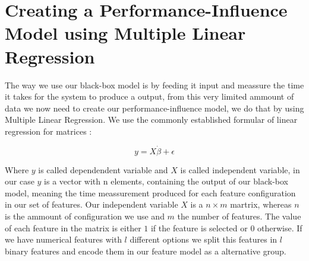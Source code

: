 \section{Creating a Performance-Influence Model using Multiple Linear Regression}
The way we use our black-box model is by feeding it input and meassure the time it takes for the system to produce a output, from this 
very limited ammount of data we now need to create our performance-influence model, we do that by using Multiple Linear Regression.
We use the commonly established formular of linear regression for matrices \cite{Linear-Regression}:

\begin{equation*}
        y = X \dot \beta + \epsilon
\end{equation*}

Where $y$ is called dependendent variable and $X$ is called independent variable, in our case $y$ is a vector with n elements, containing
the output of our black-box model, meaning the time meassurement produced for each feature configuration in our set of features. 
Our independent variable $X$ is a $n \times m$ martrix, whereas $n$ is the ammount of configuration we use and $m$ the number of features.
The value of each feature in the matrix is either $1$ if the feature is selected or $0$ otherwise. If we have numerical features with $l$
different options we split this features in $l$ binary features and encode them in our feature model as a alternative group.


